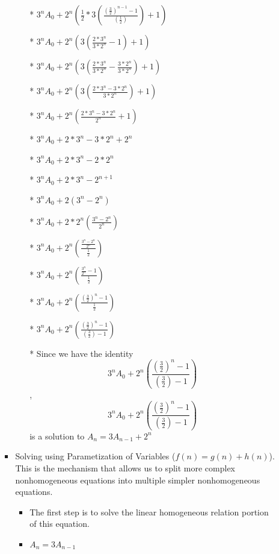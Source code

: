 \documentclass{article}
\begin{document}
\begin{enumerate}
\begin{enumerate}
\begin{itemize}
\begin{itemize}
      \item [*] $3^{n}A_{0} + 2^{n} \left(\frac{1}{2}*3\left(\frac{(\frac{3}{2})^{n-1}-1}{(\frac{1}{2})}\right)+1\right)$
      \item [*] $3^{n}A_{0} + 2^{n} \left(3\left(\frac{2*3^{n}}{3*2^{n}}-1\right)+1\right)$
      \item [*] $3^{n}A_{0} + 2^{n} \left(3\left(\frac{2*3^{n}}{3*2^{n}}-\frac{3*2^{n}}{3*2^{n}}\right)+1\right)$
      \item [*] $3^{n}A_{0} + 2^{n} \left(3\left(\frac{2*3^{n}-3*2^{n}}{3*2^{n}}\right)+1\right)$
      \item [*] $3^{n}A_{0} + 2^{n} \left(\frac{2*3^{n}-3*2^{n}}{2^{n}}+1\right)$
      \item [*] $3^{n}A_{0} + 2*3^{n}-3*2^{n}+2^{n}$
      \item [*] $3^{n}A_{0} + 2*3^{n}-2*2^{n}$
      \item [*] $3^{n}A_{0} + 2*3^{n}-2^{n+1}$
      \item [*] $3^{n}A_{0} + 2(3^{n}-2^{n})$
      \item [*] $3^{n}A_{0} + 2*2^{n}\left(\frac{3^{n}-2^{n}}{2^{n}}\right)$
      \item [*] $3^{n}A_{0} + 2^{n}\left(\frac{\frac{3^{n}-2^{n}}{2^{n} }}{\frac{1}{2}}\right)$
      \item [*] $3^{n}A_{0} + 2^{n}\left(\frac{\frac{3^{n}}{2^{n}}-1}{\frac{1}{2}}\right)$
      \item [*] $3^{n}A_{0} + 2^{n}\left(\frac{\left(\frac{3}{2}\right)^{n}-1}{\frac{1}{2}}\right)$
      \item [*] $3^{n}A_{0} + 2^{n}\left(\frac{\left(\frac{3}{2}\right)^{n}-1}{\left(\frac{3}{2}\right)-1}\right)$
      \item [*] Since we have the identity $$3^{n}A_{0} + 2^{n}\left(\frac{\left(\frac{3}{2}\right)^{n}-1}{\left(\frac{3}{2}\right)-1}\right)$$, $$3^{n}A_{0} + 2^{n}\left(\frac{\left(\frac{3}{2}\right)^{n}-1}{\left(\frac{3}{2}\right)-1}\right)$$ is a solution to $A_{n}=3A_{n-1}+2^{n}$
      \end{itemize} %
    \item Solving using Parametization of Variables ($f(n)=g(n)+h(n)$). This is the mechanism that allows us to split more complex nonhomogeneous equations into multiple simpler nonhomogeneous equations.
      \begin{itemize} %
      \item The first step is to solve the linear homogeneous relation portion of this equation.
      \item $A_{n}=3A_{n-1}$

\end{itemize}
\end{itemize}
\end{enumerate}
\end{enumerate}
\end{document}
